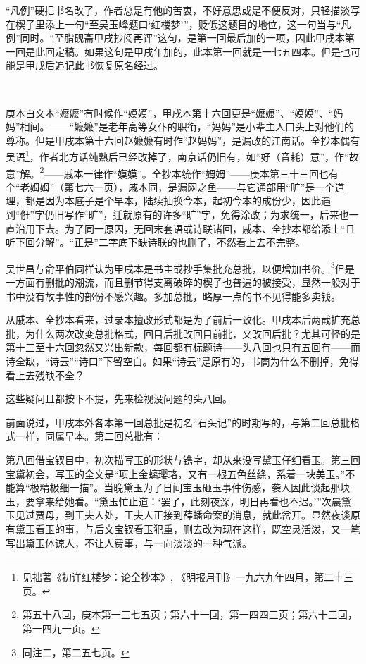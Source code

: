 \par “凡例”硬把书名改了，作者总是有他的苦衷，不好意思或是不便反对，只轻描淡写在楔子里添上一句“至吴玉峰题曰‘红楼梦’”，贬低这题目的地位，这一句当与“凡例”同时。“至脂砚斋甲戌抄阅再评”这句，是第一回最后加的一项，因此甲戌本第一回是此回定稿。如果这句是甲戌年加的，此本第一回就是一七五四本。但是也可能是甲戌后追记此书恢复原名经过。
\par  
\par 庚本白文本“嬷嬷”有时候作“嫫嫫”，甲戌本第十六回更是“嬷嬷”、“嫫嫫”、“妈妈”相间。——“嬷嬷”是老年高等女仆的职衔，“妈妈”是小辈主人口头上对他们的尊称。但是甲戌本第十六回赵嬷嬷有时作“赵妈妈”，是漏改的江南话。全抄本偶有吴语\footnote{见拙著《初详红楼梦：论全抄本》, 《明报月刊》一九六九年四月，第二十三页。}，作者北方话纯熟后已经改掉了，南京话仍旧有，如“好（音耗）意”，作“故意”解。\footnote{第五十八回，庚本第一三七五页；第六十一回，第一四四三页；第六十三回，第一四九一页。}——戚本一律作“嫫嫫”。全抄本统作“姆姆”——庚本第三十三回也有个“老姆姆”（第七六一页），戚本同，是漏网之鱼——与它通部用“旷”是一个道理，都是因为本底子是个早本，陆续抽换今本，起初今本的成份少，因此遇到“俇”字仍旧写作“旷”，迁就原有的许多“旷”字，免得涂改；为求统一，后来也一直沿用下去。为了同一原因，无回末套语或诗联诸回，戚本、全抄本都给添上“且听下回分解”。“正是”二字底下缺诗联的也删了，不然看上去不完整。
\par 吴世昌与俞平伯同样认为甲戌本是书主或抄手集批充总批，以便增加书价。\footnote{同注二，第二五七页。}但是一方面有删批的潮流，而且删节得支离破碎的楔子也普遍的被接受，显然一般对于书中没有故事性的部份不感兴趣。多加总批，略厚一点的书不见得能多卖钱。
\par 从戚本、全抄本看来，过录本擅改形式都是为了前后一致化。甲戌本后两截扩充总批，为什么两次改变总批格式，回目后批改回目前批，又改回后批？尤其可怪的是第十三至十六回忽然又兴出新款，每回都有标题诗——头八回也只有五回有——而诗全缺，“诗云”“诗曰”下留空白。如果“诗云”是原有的，书商为什么不删掉，免得看上去残缺不全？
\par 这些疑问且都按下不提，先来检视没问题的头八回。
\par 前面说过，甲戌本外各本第一回总批是初名“石头记”的时期写的，与第二回总批格式一样，同属早本。第二回总批有：
\par 第八回借宝钗目中，初次描写玉的形状与镌字，却从来没写黛玉仔细看玉。第三回宝黛初会，写玉的全文是“项上金螭璎珞，又有一根五色丝绦，系着一块美玉。”不能算“极精极细一描”。当晚黛玉为了日间宝玉砸玉事件伤感，袭人因此谈起那块玉，要拿来给她看。“黛玉忙止道：‘罢了，此刻夜深，明日再看也不迟。'”次晨黛玉见过贾母，到王夫人处，王夫人正接到薛蟠命案的消息，就此岔开。显然夜谈原有黛玉看玉的事，与后文宝钗看玉犯重，删去改为现在这样，既空灵活泼，又一笔写出黛玉体谅人，不让人费事，与一向淡淡的一种气派。

